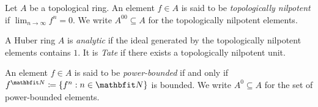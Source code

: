 \begin{dfn}
	Let $A$ be a topological ring.
	An element $f \in A$ is said to be \emph{topologically nilpotent} if $\lim_{n \to \infty} f^n = 0$.
	We write $A^{00} \subseteq A$ for the topologically nilpotent elements.

	A Huber ring $A$ is \emph{analytic} if the ideal generated by the topologically nilpotent elements contains $1$.
	It is \emph{Tate} if there exists a topologically nilpotent unit.
\end{dfn}

\begin{dfn}
	An element $f\in A$ is said to be \emph{power-bounded} if and only if $f^{\NN} \coloneq \{f^n : n \in \NN\}$ is bounded.
	We write $A^0 \subseteq A$ for the set of power-bounded elements.
\end{dfn}
